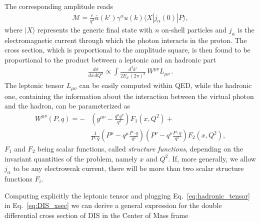 %
The corresponding amplitude reads
\begin{align}
    \label{eq:DIS_amplitude}
    \mathcal{M} = 
    \frac{e}{q^2}\bar{u}\left(k'\right)\gamma^{\alpha}u\left(k\right)\langle X | j_{\alpha}\left(0\right)|P\rangle,
\end{align}
where $|X\rangle $ represents the generic final state with $n$ on-shell particles and $j_{\alpha}$ 
is the electromagnetic current through which the photon interacts in the proton.
The cross section, which is proportional to the amplitude square, is then found to be proportional to the product between 
a leptonic and an hadronic part
\begin{align}
    \label{eq:DIS_xsec}
    \frac{d\sigma}{dx\,dQ^2} \propto \int \frac{d^3k'}{2E_{k'}\left(2\pi\right)^3}\, W^{\mu\nu}L_{\mu\nu}\,.
\end{align}
The leptonic tensor $L_{\mu\nu}$ can be easily computed within QED, while the hadronic one, containing 
the information about the interaction between the virtual photon and the hadron, can be parameterized as 
\begin{align}
    \label{eq:hadronic_tensor}
    W^{\mu\nu}\left(P,q\right) = 
    -&\left(g^{\mu\nu} -\frac{q^{\mu}q^{\nu}}{q^2}\right)F_1\left(x,Q^2\right) + \nonumber \\
    &\frac{1}{P\cdot q}\left(P^{\mu}-q^{\mu}\frac{P\cdot q}{q^2}\right)\left(P^{\nu}-q^{\nu}\frac{P\cdot q}{q^2}\right)
    F_2\left(x,Q^2\right),
\end{align}
$F_1 $ and $F_2 $ being scalar functions, called \textit{structure functions}, 
depending on the invariant quantities of the problem, namely $x$ and $Q^2$. If, more generally,
we allow $j_{\alpha}$ to be any electroweak current, there will be more than two scalar structure functions $F_i$.

%
Computing explicitly the leptonic tensor and plugging Eq.~\eqref{eq:hadronic_tensor} in Eq.~\eqref{eq:DIS_xsec} 
we can derive a general expression for the double differential cross section of DIS in the Center of Mass frame

